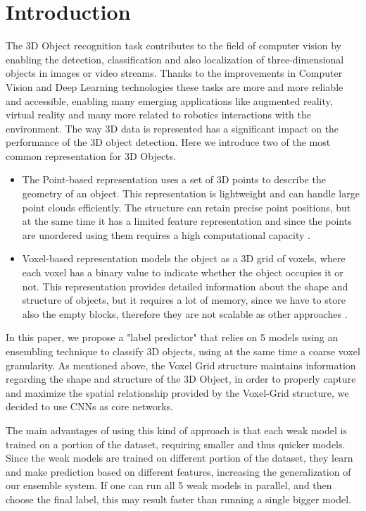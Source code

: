 
\section{Introduction}
\label{sec:introduction}

The 3D Object recognition task contributes to the field of computer vision by enabling the detection, classification and also localization of three-dimensional objects in images or video streams. Thanks to the improvements in Computer Vision and Deep Learning technologies these tasks are more and more reliable and accessible, enabling many emerging applications like augmented reality, virtual reality and many more related to robotics interactions with the environment. 
The way 3D data is represented has a significant impact on the performance of the 3D object detection. Here we introduce two of the most common representation for 3D Objects.
\begin{itemize}
    \item The Point-based representation uses a set of 3D points to describe the geometry of an object. This representation is lightweight and can handle large point clouds efficiently. The structure can  retain precise point positions, but at the same time it has a limited feature representation and since the points are unordered using them requires a high computational capacity \cite{liu2019pointvoxel}.

    \item Voxel-based representation models the object as a 3D grid of voxels, where each voxel has a binary value to indicate whether the object occupies it or not. This representation provides detailed information about the shape and structure of objects, but it requires a lot of memory, since we have to store also the empty blocks, therefore they are not scalable as other approaches \cite{liu2019pointvoxel}.
\end{itemize}

In this paper, we propose a "label predictor" that relies on 5 models using an ensembling technique to classify 3D objects, using at the same time a coarse voxel granularity. 
As mentioned above, the Voxel Grid structure maintains information regarding the shape and structure of the 3D Object, in order to properly capture and maximize the spatial relationship provided by the Voxel-Grid structure, we decided to use \ac{CNN}s as core networks. 

The main advantages of using this kind of approach is that each weak model is trained on a portion of the dataset, requiring smaller and thus quicker models. Since the weak models are trained on different portion of the dataset, they learn and make prediction based on different features, increasing the generalization of our ensemble system. If one can run all 5 weak models in parallel, and then choose the final label, this may result faster than running a single bigger model.


